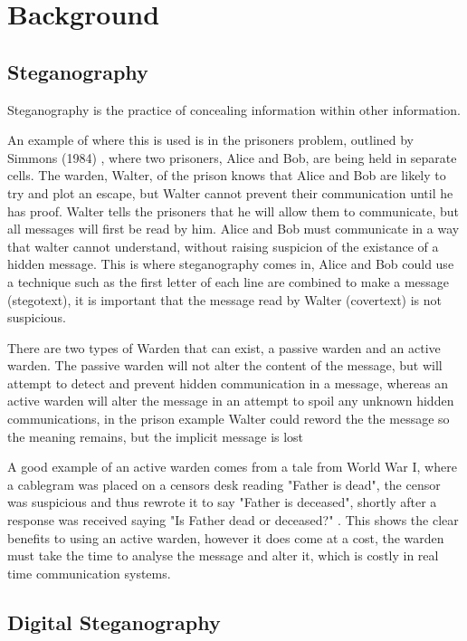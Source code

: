 \chapter{Background}
\label{ch:background}

\section{Steganography}

Steganography is the practice of concealing information within other information.

An example of where this is used is in the prisoners problem, outlined by Simmons (1984) \cite{SIMMONS}, where two prisoners, Alice and Bob, are being held in separate cells. The warden, Walter, of the prison knows that Alice and Bob are likely to try and plot an escape, but Walter cannot prevent their communication until he has proof. Walter tells the prisoners that he will allow them to communicate, but all messages will first be read by him. Alice and Bob must communicate in a way that walter cannot understand, without raising suspicion of the existance of a hidden message. This is where steganography comes in, Alice and Bob could use a technique such as the first letter of each line are combined to make a message (stegotext), it is important that the message read by Walter (covertext) is not suspicious.

There are two types of Warden that can exist, a passive warden and an active warden. The passive warden will not alter the content of the message, but will attempt to detect and prevent hidden communication in a message, whereas an active warden will alter the message in an attempt to spoil any unknown hidden communications, in the prison example Walter could reword the the message so the meaning remains, but the implicit message is lost \cite{aSoCaSaAWA}

A good example of an active warden comes from a tale from World War I, where a cablegram was placed on a censors desk reading "Father is dead", the censor was suspicious and thus rewrote it to say "Father is deceased", shortly after a response was received saying "Is Father dead or deceased?" \cite{TCTSoSW}. This shows the clear benefits to using an active warden, however it does come at a cost, the warden must take the time to analyse the message and alter it, which is costly in real time communication systems.

\section{Digital Steganography}

